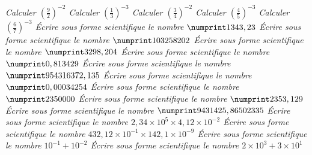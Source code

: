 \fi   \if{}  \it
  Calculer  $\left(\frac92\right)^{-2}$
\fi   \if{}  \it
  Calculer  $\left(\frac13\right)^{-3}$
 \fi   \if{} \it
  Calculer  $\left(\frac34\right)^{-2}$
\fi   \if{}  \it
  Calculer  $\left( \frac45 \right)^{-3}$
 \fi   \if{} \it
  Calculer  $\left(\frac67\right)^{-3}$
\fi
\if{}  \it
  Écrire sous forme scientifique le nombre  $\np{1343,23}$
\fi   \if{}  \it
  Écrire sous forme scientifique le nombre  $\np{103258202}$
\fi   \if{}  \it
  Écrire sous forme scientifique le nombre  $\np{3298,204}$
\fi   \if{}  \it
  Écrire sous forme scientifique le nombre  $\np{0,813429}$
 \fi   \if{} \it
  Écrire sous forme scientifique le nombre  $\np{954316372,135}$
 \fi   \if{} \it
  Écrire sous forme scientifique le nombre  $\np{0,00034254}$
\fi   \if{}  \it
  Écrire sous forme scientifique le nombre  $\np{2350000}$
\fi   \if{}  \it
  Écrire sous forme scientifique le nombre  $\np{2353,129}$
\fi   \if{}  \it
  Écrire sous forme scientifique le nombre  $\np{9431425,86502335}$ 
\fi   \if{}  \it
  Écrire sous forme scientifique le nombre  $2,34 \times 10^5 \times 4,12 \times 10^{-2}$
\fi   \if{}  \it
  Écrire sous forme scientifique le nombre  $432,12 \times 10^{-1} \times 142,1 \times 10^{-9}$
\fi   \if{}  \it
  Écrire sous forme scientifique le nombre  $10^{-1}+10^{-2}$
\fi   \if{}  \it
  Écrire sous forme scientifique le nombre  $2\times 10^3 + 3 \times 10^1$
\fi
  
